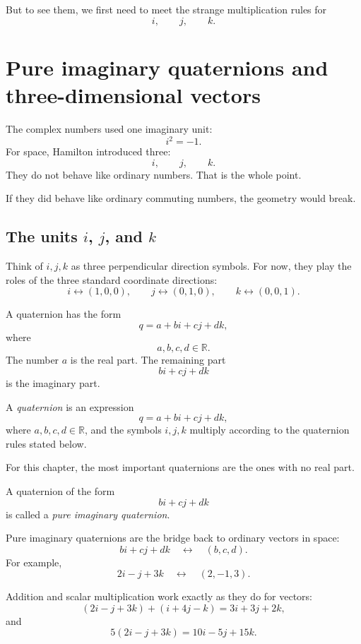 But to see them, we first need to meet the strange multiplication rules for
\[
    i,\qquad j,\qquad k.
\]

\section{Pure imaginary quaternions and three-dimensional vectors}

The complex numbers used one imaginary unit:
\[
    i^2=-1.
\]
For space, Hamilton introduced three:
\[
    i,\qquad j,\qquad k.
\]
They do not behave like ordinary numbers.  That is the whole point.

If they did behave like ordinary commuting numbers, the geometry would break.

\subsection{The units \(i\), \(j\), and \(k\)}

Think of \(i,j,k\) as three perpendicular direction symbols.  For now, they play the roles
of the three standard coordinate directions:
\[
    i \leftrightarrow (1,0,0),\qquad
    j \leftrightarrow (0,1,0),\qquad
    k \leftrightarrow (0,0,1).
\]

A quaternion has the form
\[
    q=a+bi+cj+dk,
\]
where
\[
    a,b,c,d\in\mathbb R.
\]
The number \(a\) is the real part.  The remaining part
\[
    bi+cj+dk
\]
is the imaginary part.

\begin{definition}[Quaternions]
A \emph{quaternion} is an expression
\[
    q=a+bi+cj+dk,
\]
where \(a,b,c,d\in\mathbb R\), and the symbols \(i,j,k\) multiply according to the
quaternion rules stated below.
\end{definition}

For this chapter, the most important quaternions are the ones with no real part.

\begin{definition}
A quaternion of the form
\[
    bi+cj+dk
\]
is called a \emph{pure imaginary quaternion}.
\end{definition}

Pure imaginary quaternions are the bridge back to ordinary vectors in space:
\[
    bi+cj+dk
    \quad\longleftrightarrow\quad
    (b,c,d).
\]
For example,
\[
    2i-j+3k
    \quad\longleftrightarrow\quad
    (2,-1,3).
\]

Addition and scalar multiplication work exactly as they do for vectors:
\[
    (2i-j+3k)+(i+4j-k)=3i+3j+2k,
\]
and
\[
    5(2i-j+3k)=10i-5j+15k.
\]

